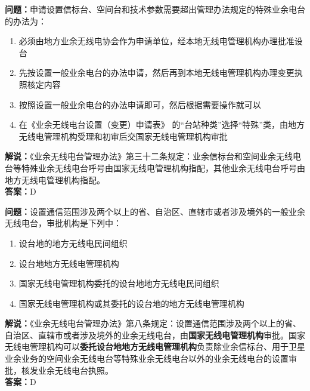 \noindent\textbf{问题：}申请设置信标台、空间台和技术参数需要超出管理办法规定的特殊业余电台的办法为：
\begin{enumerate}[label=\Alph*), leftmargin=3em]
\item 必须由地方业余无线电协会作为申请单位，经本地无线电管理机构办理批准设台
\item 先按设置一般业余电台的办法申请，然后再到本地无线电管理机构办理变更执照核定内容
\item 按照设置一般业余电台的办法申请即可，然后根据需要操作就可以
\item 在《业余无线电台设置（变更）申请表》 的“台站种类”选择“特殊”类，由地方无线电管理机构受理和初审后交国家无线电管理机构审批
\end{enumerate}
\noindent\textbf{解说：}《业余无线电台管理办法》第三十二条规定：业余信标台和空间业余无线电台等特殊业余无线电台呼号由国家无线电管理机构指配，其他业余无线电台呼号由地方无线电管理机构指配。\\\noindent\textbf{答案：}D



\bigskip


\noindent\textbf{问题：}设置通信范围涉及两个以上的省、自治区、直辖市或者涉及境外的一般业余无线电台，审批机构是下列中：
\begin{enumerate}[label=\Alph*), leftmargin=3em]
\item 设台地的地方无线电民间组织
\item 设台地地方无线电管理机构
\item 国家无线电管理机构委托的设台地地方无线电民间组织
\item 国家无线电管理机构或其委托的设台地的地方无线电管理机构
\end{enumerate}
\noindent\textbf{解说：}《业余无线电台管理办法》第八条规定：设置通信范围涉及两个以上的省、自治区、直辖市或者涉及境外的业余无线电台，由\textbf{国家无线电管理机构}审批。国家无线电管理机构可以\textbf{委托设台地地方无线电管理机构}负责除业余信标台、用于卫星业余业务的空间业余无线电台等特殊业余无线电台以外的业余无线电台的设置审批，核发业余无线电台执照。 \\\noindent\textbf{答案：}D

\bigskip


